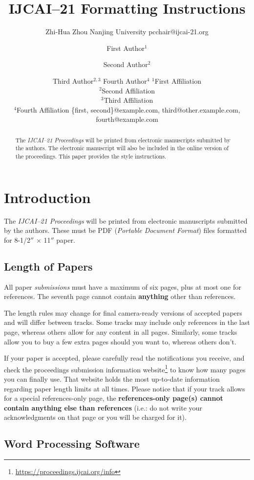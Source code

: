 \documentclass{article}
\title{IJCAI--21 Formatting Instructions}
\author{
    Zhi-Hua Zhou
    \affiliations
    Nanjing University
    \emails
    pcchair@ijcai-21.org
}
\author{
First Author$^1$
\and
Second Author$^2$\and
Third Author$^{2,3}$\And
Fourth Author$^4$
\affiliations
$^1$First Affiliation\\
$^2$Second Affiliation\\
$^3$Third Affiliation\\
$^4$Fourth Affiliation
\emails
\{first, second\}@example.com,
third@other.example.com,
fourth@example.com
}
\begin{document}
\maketitle

\begin{abstract}
  The {\it IJCAI--21 Proceedings} will be printed from electronic
  manuscripts submitted by the authors. The electronic manuscript will
  also be included in the online version of the proceedings. This paper
  provides the style instructions.
\end{abstract}

\section{Introduction}

The {\it IJCAI--21 Proceedings} will be printed from electronic
manuscripts submitted by the authors. These must be PDF ({\em Portable
Document Format}) files formatted for 8-1/2$''$ $\times$ 11$''$ paper.

\subsection{Length of Papers}

All paper {\em submissions} must have a maximum of six pages, plus at most one for references. The seventh page cannot contain {\bf anything} other than references.

The length rules may change for final camera-ready versions of accepted papers and will differ between tracks. Some tracks may include only references in the last page, whereas others allow for any content in all pages. Similarly, some tracks allow you to buy a few extra pages should you want to, whereas others don't.

If your paper is accepted, please carefully read the notifications you receive, and check the proceedings submission information website\footnote{\url{https://proceedings.ijcai.org/info}} to know how many pages you can finally use. That website holds the most up-to-date information regarding paper length limits at all times. Please notice that if your track allows for a special references-only page, the {\bf references-only page(s) cannot contain anything else than references} (i.e.: do not write your acknowledgments on that page or you will be charged for it).

\subsection{Word Processing Software}
\end{document}
